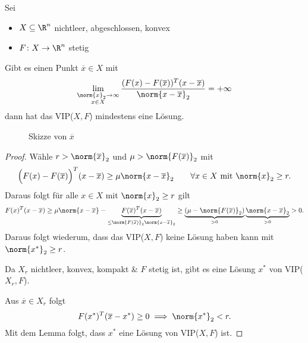 \begin{satz}
	Sei
	\begin{itemize}
		\item $X \subseteq \R^{n}$ nichtleer, abgeschlossen, konvex
		\item $F \colon X \rightarrow \R^{n} $ stetig
	\end{itemize}
	Gibt es einen Punkt $\overline{x} \in X$ mit
	\[
		\lim_{\substack{\norm{x}_{2} \rightarrow \infty \\ x \in X}} \frac{(F(x) - F(\overline{x}))^{T}(x-\overline{x})}{\norm{x-\overline{x}}_{2} } = + \infty
	\] 
	dann hat das VIP($X,F$) mindestens eine Lösung.
\end{satz}

\begin{figure}[H]
	\begin{center}
		
	\end{center}
	\caption{Skizze von $\overline{x}$}
	\label{fig:XR3}
\end{figure}
	
\begin{proof}
	Wähle $r > \norm{\overline{x}}_{2} $ und $\mu > \norm{F(\overline{x})} _{2}$ mit
	\[
		\Big( F(x) - F(\overline{x}) \Big) ^{T}(x-\overline{x}) \geq  \mu  \norm{x -\overline{x}} _{2} \qquad \forall x \in X \text{ mit } \norm{x} _{2} \geq  r
	.\] 
	Daraus folgt für alle $x \in X$ mit $\norm{x} _{2}\geq r$ gilt
	\[
		F(x)^{T}(x-\overline{x}) \geq  \mu \norm{x-\overline{x}} - \underbrace{F(\overline{x})^{T}(x-\overline{x})}_{\leq \norm{F(\overline{x})} _{2}\norm{x-\overline{x}} _{2}} \geq \underbrace{(\mu -\norm{F(\overline{x})} _{2})}_{>0} \underbrace{\norm{x-\overline{x}} _{2}}_{>0} >0
	.\] 
	Daraus folgt wiederum, dass das VIP($X,F$) keine Lösung haben kann mit $\norm{{x}^{*}} _{2}\geq  r$.

	Da $X_{r}$ nichtleer, konvex, kompakt \& $F$ stetig ist, gibt es eine Lösung ${x}^{*}$ von VIP($X_{r},F$).

	Aus $\overline{x} \in X_{r}$ folgt
	\[
		F({x}^{*})^{T}(\overline{x}-{x}^{*})\geq 0 \implies \norm{{x}^{*}} _{2}< r
	.\] 
	Mit dem Lemma folgt, dass ${x}^{*}$ eine Lösung von VIP($X,F$) ist.
\end{proof}

